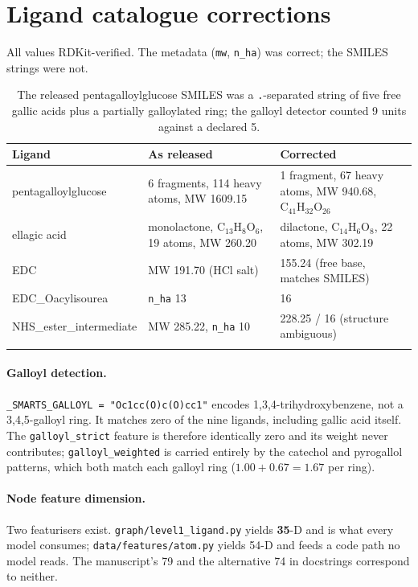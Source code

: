 \documentclass[11pt,a4paper]{article}
\newcommand{\ok}[1]{\textcolor{okgreen}{#1}}
\newcommand{\bad}[1]{\textcolor{badred}{#1}}
\newcommand{\warn}[1]{\textcolor{warnamber}{#1}}
\newcommand{\code}[1]{\texttt{\small #1}}
\begin{document}
\section{Ligand catalogue corrections}

All values RDKit-verified. The metadata (\code{mw}, \code{n\_ha}) was
correct; the SMILES strings were not.

\begin{longtable}{@{}p{3.9cm}p{4.5cm}p{4.5cm}@{}}
\toprule
\textbf{Ligand} & \textbf{As released} & \textbf{Corrected} \\
\midrule
\endhead
pentagalloylglucose &
  \bad{6 fragments}, 114 heavy atoms, MW 1609.15 &
  \ok{1 fragment}, 67 heavy atoms, MW 940.68, $\mathrm{C_{41}H_{32}O_{26}}$ \\
ellagic acid &
  \bad{monolactone}, $\mathrm{C_{13}H_{8}O_{6}}$, 19 atoms, MW 260.20 &
  \ok{dilactone}, $\mathrm{C_{14}H_{6}O_{8}}$, 22 atoms, MW 302.19 \\
EDC & MW 191.70 ($\mathrm{HCl}$ salt) & 155.24 (free base, matches SMILES) \\
EDC\_Oacylisourea & \code{n\_ha} 13 & 16 \\
NHS\_ester\_intermediate & MW 285.22, \code{n\_ha} 10 & 228.25 / 16 \warn{(structure ambiguous)} \\
\bottomrule
\caption{The released pentagalloylglucose SMILES was a \code{.}-separated
string of five free gallic acids plus a partially galloylated ring; the
galloyl detector counted 9 units against a declared 5.}
\end{longtable}

\paragraph{Galloyl detection.}
\code{\_SMARTS\_GALLOYL = "Oc1cc(O)c(O)cc1"} encodes
1,3,4-trihydroxybenzene, not a 3,4,5-galloyl ring. It matches
\bad{zero} of the nine ligands, including gallic acid itself. The
\code{galloyl\_strict} feature is therefore identically zero and its
weight never contributes; \code{galloyl\_weighted} is carried entirely by
the catechol and pyrogallol patterns, which both match each galloyl ring
($1.00 + 0.67 = 1.67$ per ring).

\paragraph{Node feature dimension.}
Two featurisers exist. \code{graph/level1\_ligand.py} yields
\textbf{35}-D and is what every model consumes;
\code{data/features/atom.py} yields 54-D and feeds a code path no model
reads. The manuscript's 79 and the alternative 74 in docstrings
correspond to neither.
\end{document}
